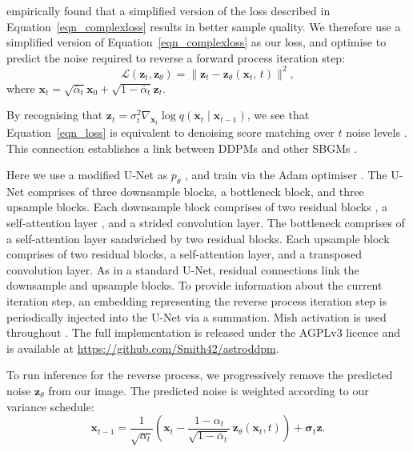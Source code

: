 \documentclass[fleqn,usenatbib]{mnras}
\begin{document}
\citet{cite_ho2020} empirically found that a simplified version of the loss
described in Equation~\ref{eqn_complexloss} results in better sample quality.
We therefore use a simplified version of Equation~\ref{eqn_complexloss} as our
loss, and optimise to predict the noise required to reverse a forward process
iteration step:
\begin{equation}
    \mathcal{L}(\mathbf{z}_t, \mathbf{z}_\theta) = \| \mathbf{z}_t - \mathbf{z}_\theta (\textbf{x}_t,\,t) \|^2,
    \label{eqn_loss}
\end{equation}
where $\mathbf{x}_t = \sqrt{\bar{\alpha}_t} \mathbf{x}_0 + \sqrt{1 -
\bar{\alpha}_t}\mathbf{z}_t$.

By recognising that $\mathbf{z}_t = \sigma_t^2 \nabla_{\mathbf{x}_t} \log q(\mathbf{x}_t
\mid \mathbf{x}_{t - 1})$, we see that Equation~\ref{eqn_loss} is equivalent to
denoising score matching over $t$ noise levels \citep{cite_vincent2011}.  This
connection establishes a link between DDPMs and other SBGMs \citep[such
as][]{cite_song2019,cite_song2020,cite_ajm2020}.  

Here we use a modified U-Net as $p_\theta$
\citep{cite_ronneberger2015,cite_salimans2017}, and train via the Adam
optimiser \citep{cite_kingma2015}.  The U-Net comprises of three downsample
blocks, a bottleneck block, and three upsample blocks. Each downsample block
comprises of two residual blocks \citep{cite_srivastava2015,cite_he2015}, a
self-attention layer \citep{cite_bahdanau2014,cite_cheng2016}, and a strided
convolution layer. The bottleneck comprises of a self-attention layer
sandwiched by two residual blocks. Each upsample block comprises of two
residual blocks, a self-attention layer, and a transposed convolution layer. As
in a standard U-Net, residual connections link the downsample and upsample
blocks. To provide information about the current iteration step, an embedding
representing the reverse process iteration step is periodically injected into
the U-Net via a summation.  Mish activation is used throughout
\citep{cite_mish}. The full implementation is released under the AGPLv3 licence
and is available at \url{https://github.com/Smith42/astroddpm}.

To run inference for the reverse process, we progressively remove the predicted
noise $\mathbf{z}_\theta$ from our image. The predicted noise is weighted
according to our variance schedule:
\begin{equation}
    \mathbf{x}_{t-1} = \frac{1}{\sqrt{\alpha_t}} \left(\mathbf{x}_t - \frac{1 - \alpha_t}{\sqrt{1 - \bar{\alpha}_t}}\,\mathbf{z}_\theta(\mathbf{x}_t, t)\right) + \boldsymbol{\sigma}_t \mathbf{z}.
\end{equation}
\end{document}
